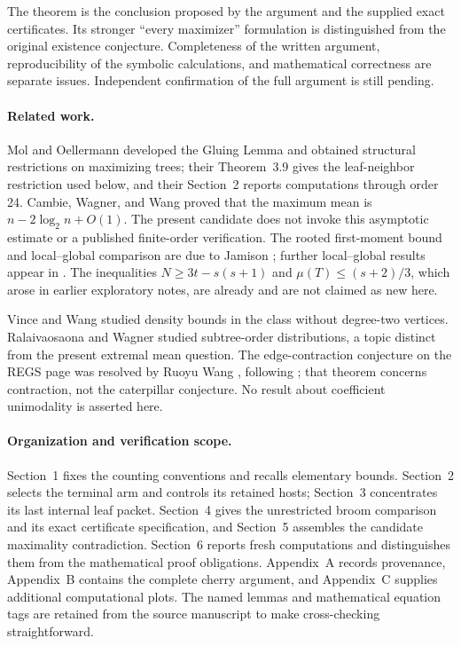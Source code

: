 \documentclass[11pt,reqno]{amsart}
\theoremstyle{plain}
\begin{document}
The theorem is the conclusion proposed by the argument and the supplied exact
certificates. Its stronger ``every maximizer'' formulation is distinguished
from the original existence conjecture. Completeness of the written argument,
reproducibility of the symbolic calculations, and mathematical correctness are
separate issues. Independent confirmation of the full argument is still pending.

\paragraph{Related work.}
Mol and Oellermann \cite{MolOellermann2019} developed the Gluing Lemma and obtained
structural restrictions on maximizing trees; their Theorem~3.9 gives the
leaf-neighbor restriction used below, and their Section~2 reports computations
through order 24. Cambie, Wagner, and Wang \cite{CambieWagnerWang2021} proved that
the maximum mean is $n-2\log_2 n+O(1)$. The present candidate does not invoke this
asymptotic estimate or a published finite-order verification. The rooted
first-moment bound and local--global comparison are due to Jamison
\cite[Lemma~3.2(c) and Theorem~3.9]{Jamison1983}; further local--global results
appear in \cite{WagnerWang2016}. The inequalities $N\ge3t-s(s+1)$ and
$\mu(T)\le(s+2)/3$, which arose in earlier exploratory notes, are already
\cite[Lemma~3.1 and Corollary~4.3]{LuoXuWagnerWang2023} and are not claimed as
new here.

Vince and Wang \cite{VinceWang2010} studied density bounds in the class without
degree-two vertices. Ralaivaosaona and Wagner \cite{RalaivaosaonaWagner2018}
studied subtree-order distributions, a topic distinct from the present extremal
mean question. The edge-contraction conjecture on the REGS page was resolved
by Ruoyu Wang \cite{RuoyuWang2024}, following
\cite{LuoXuWagnerWang2023}; that theorem concerns contraction, not the
caterpillar conjecture. No result about coefficient unimodality is asserted here.

\paragraph{Organization and verification scope.}
Section~1 fixes the counting conventions and recalls elementary bounds.
Section~2 selects the terminal arm and controls its retained hosts; Section~3
concentrates its last internal leaf packet. Section~4 gives the unrestricted
broom comparison and its exact certificate specification, and Section~5
assembles the candidate maximality contradiction. Section~6 reports fresh
computations and distinguishes them from the mathematical proof obligations.
Appendix~A records provenance, Appendix~B contains the complete cherry argument,
and Appendix~C supplies additional computational plots. The named lemmas and
mathematical equation tags are retained from the source manuscript to make
cross-checking straightforward.
\end{document}
